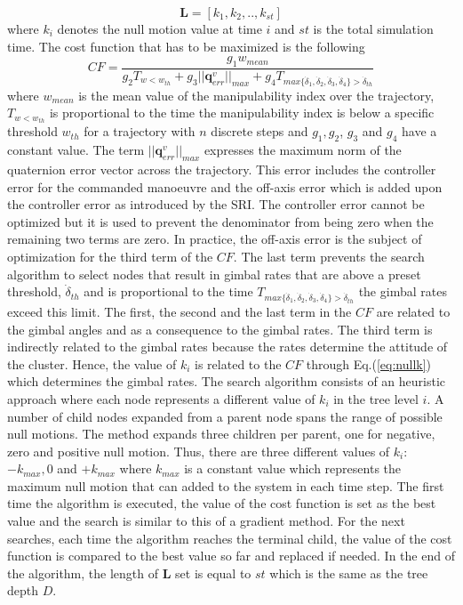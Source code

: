 \documentclass[journal]{new-aiaa}
\begin{document}
\begin{equation}
\textbf{L}=[k_1, k_2, .., k_{st} ]
\end{equation}
where $k_i$ denotes the null motion value at time $i$ and $st$ is the total simulation time. The cost function that has to be maximized is the following
\begin{equation}
\label{eq:costfunction}
  CF=\frac{ g_1w_{mean}}{
  g_2T_{w<w_{th}} +g_3 ||\textbf{q}_{err}^v||_{max}+g_4T_{max\{\dot\delta_1, \dot\delta_2, \dot\delta_3, \dot\delta_4\}>\dot \delta_{th}}}
\end{equation}
where $w_{mean}$ is the mean value of the manipulability index over the trajectory, $T_{w<w_{th}}$ is proportional to the time the manipulability index is below a specific threshold $w_{th}$ for a trajectory with $n$ discrete steps and $g_1, g_2$, $g_3$ and $g_4$ have a constant value. The term $||\textbf{q}_{err}^v||_{max}$ expresses the maximum norm of the quaternion error vector across the trajectory. This error includes the controller error for the commanded manoeuvre and the off-axis error which is added upon the controller error as introduced by the SRI. The controller error cannot be optimized but it is used to prevent the denominator from being zero when the remaining two terms are zero. In practice, the off-axis error is the subject of optimization for the third term of the $CF$.  The last term prevents the search algorithm to select nodes that result in gimbal rates that are above a preset threshold, $\dot{{\delta}}_{th}$ and is proportional to the time  $T_{max\{\dot\delta_1, \dot\delta_2, \dot\delta_3, \dot\delta_4\}>\dot \delta_{th}}$  the gimbal rates exceed this limit. The first, the second and the last term in the $CF$ are related to the gimbal angles and as a consequence to the gimbal rates. The third term is indirectly related to the gimbal rates because the rates determine the attitude of the cluster. Hence, the value of $k_i$ is related to the $CF$ through Eq.(\ref{eq:nullk}) which determines the gimbal rates.  The search algorithm consists of an heuristic approach where each node represents a different value of $k_i$ in the tree level $i$. A number of child nodes expanded from a parent node spans the range of possible null motions. The method expands three children per parent, one for negative, zero and positive null motion. Thus, there are three different values of $k_i$:  $-k_{max}, 0$ and $ +k_{max}$ where $k_{max}$ is a constant value which represents the maximum null motion that can added to the system in each time step. The first time  the algorithm is executed, the value of the cost function is set as the best value and the search is similar to this of a gradient method. For the next searches, each time the algorithm reaches the terminal child, the value of the cost function is compared to the best value so far and replaced if needed. In the end of the algorithm, the length of $\textbf{L}$ set is equal to $st$ which is the same as the tree depth $D$.
\end{document}
